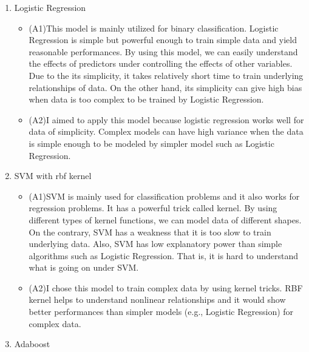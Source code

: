 \documentclass{article}
\providecommand{\tightlist}{%
      \setlength{\itemsep}{0pt}\setlength{\parskip}{0pt}}
\begin{document}
\begin{enumerate}
\def\labelenumi{\arabic{enumi}.}
\tightlist
\item
  Logistic Regression

  \begin{itemize}
  \tightlist
  \item
    (A1)This model is mainly utilized for binary classification.
    Logistic Regression is simple but powerful enough to train simple
    data and yield reasonable performances. By using this model, we can
    easily understand the effects of predictors under controlling the
    effects of other variables. Due to the its simplicity, it takes
    relatively short time to train underlying relationships of data. On
    the other hand, its simplicity can give high bias when data is too
    complex to be trained by Logistic Regression.
  \item
    (A2)I aimed to apply this model because logistic regression works
    well for data of simplicity. Complex models can have high variance
    when the data is simple enough to be modeled by simpler model such
    as Logistic Regression.
  \end{itemize}
\item
  SVM with rbf kernel

  \begin{itemize}
  \tightlist
  \item
    (A1)SVM is mainly used for classification problems and it also works
    for regression problems. It has a powerful trick called kernel. By
    using different types of kernel functions, we can model data of
    different shapes. On the contrary, SVM has a weakness that it is too
    slow to train underlying data. Also, SVM has low explanatory power
    than simple algorithms such as Logistic Regression. That is, it is
    hard to understand what is going on under SVM.
  \item
    (A2)I chose this model to train complex data by using kernel tricks.
    RBF kernel helps to understand nonlinear relationships and it would
    show better performances than simpler models (e.g., Logistic
    Regression) for complex data.
  \end{itemize}
\item
  Adaboost


\end{enumerate}
\end{document}
